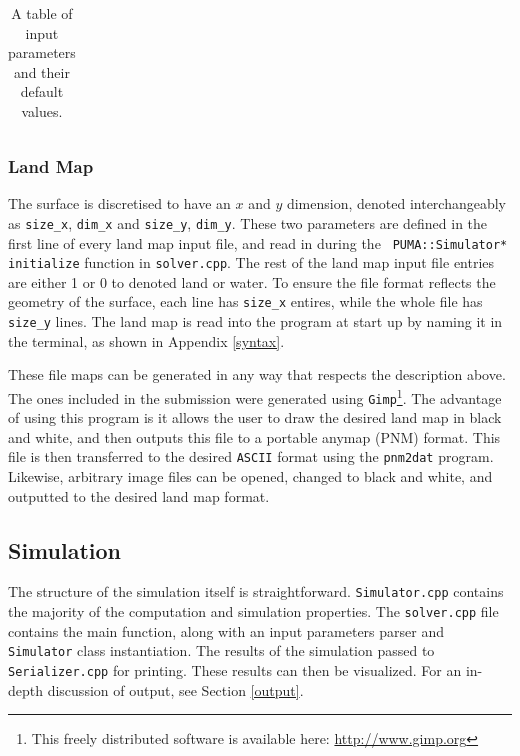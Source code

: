 \documentclass[a4paper,11pt]{article}
\begin{document}
{\begin{table}
\begin{tabular}{|l|l|l|l|}
\end{tabular}
\caption{A table of input parameters and their default values.}
\label{tb:parameters}
\end{table}


\subsubsection{Land Map}

The surface is discretised to have an $x$ and $y$ dimension, denoted interchangeably as \texttt{size\_x}, \texttt{dim\_x} and \texttt{size\_y}, \texttt{dim\_y}.  These two parameters are defined in the first line of every land map input file, and read in during the \texttt{ PUMA::Simulator* initialize} function in \texttt{solver.cpp}.  The rest of the land map input file entries are either 1 or 0 to denoted land or water.  To ensure the file format reflects the geometry of the surface, each line has \texttt{size\_x} entires, while the whole file has \texttt{size\_y} lines. The land map is read into the program at start up by naming it in the terminal, as shown in Appendix \ref{syntax}.

These file maps can be generated in any way that respects the description above.  The ones included in the submission were generated using \texttt{Gimp}\footnote{This freely distributed software is available here: \url{http://www.gimp.org}}.  The advantage of using this program is it allows the user to draw the desired land map in black and white, and then outputs this file to a portable anymap (PNM) format.  This file is then transferred to the desired \texttt{ASCII} format using the \texttt{pnm2dat} program.  Likewise, arbitrary image files can be opened, changed to black and white, and outputted to the desired land map format.

\subsection{Simulation}

The structure of the simulation itself is straightforward.  \texttt{Simulator.cpp} contains the majority of the computation and simulation properties.  The \texttt{solver.cpp} file contains the main function, along with an input parameters parser and \texttt{Simulator} class instantiation.  The results of the simulation passed to \texttt{Serializer.cpp} for printing.  These results can then be visualized.  For an in-depth discussion of output, see Section \ref{output}.

}
\end{document}
